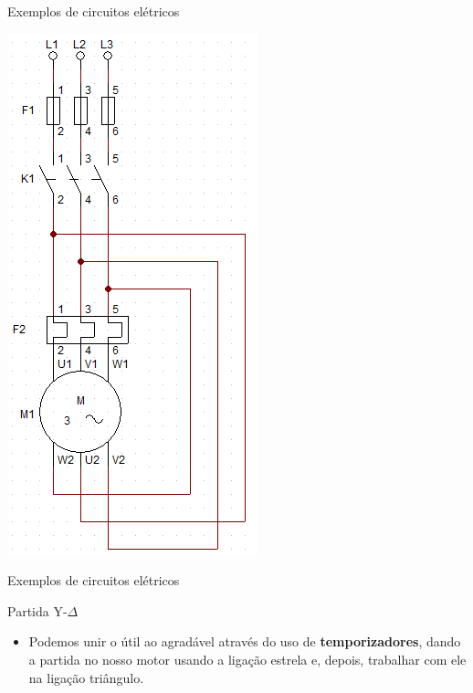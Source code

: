 \begin{frame}{Exemplos de circuitos elétricos}
\centerline{\includegraphics[height=0.9\textheight]{Figuras/Ch07/fig19.jpg}}
\end{frame}


\begin{frame}{Exemplos de circuitos elétricos}
\begin{block}{Partida Y-$ \Delta $}
\begin{itemize}
    \item Podemos unir o útil ao agradável através do uso de \textbf{temporizadores}, dando a partida no nosso motor usando a ligação estrela e, depois, trabalhar com ele na ligação triângulo.
\end{itemize}
\end{block}
\end{frame}


